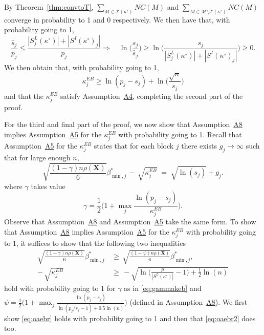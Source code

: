 \documentclass[
  12pt]{article}
\newcommand{\M}{\mathcal{M}}
\newcommand{\T}{\mathcal{T}}
\newcommand{\bX}{\mathbf{X}}
\begin{document}
By Theorem~\ref{thm:convtoT}, $\sum_{M \in \T(\kappa^{\circ})}NC(M)$ and $\sum_{M \in \M\setminus\T(\kappa^{\circ})}NC(M)$ converge in probability to 1 and 0 respectively. We then have that, with probability going to 1,
\begin{equation*}
    \frac{\hat{s}_j}{p_j}\leq \frac{|S^{L}_j(\kappa^{\circ})|+|S^{I}(\kappa^{\circ})_j|}{p_j} \Longrightarrow
    \quad\ln\Big(\frac{s_j}{\hat{s}_j}\Big)\geq \ln\bigg(\frac{s_j}{|S^{L}_j(\kappa^{\circ})|+|S^{I}(\kappa^{\circ})_j|} \bigg) \geq 0.
\end{equation*}
We then obtain that, with probability going to 1,
\begin{equation}\label{eq:eeeeeeeh}
    \kappa^{EB}_j
    \geq  \ln(p_j-s_j)+\ln\Big(\frac{\sqrt{n}}{s_j}\Big)
\end{equation}
and that the $\kappa^{EB}_j$ satisfy Assumption~\hyperlink{lab:A4}{A4}, completing the second part of the proof.\medskip

For the third and final part of the proof, 
we now show that Assumption~\hyperlink{lab:A8}{A8} implies Assumption~\hyperlink{lab:A5}{A5} for the $\kappa_j^{EB}$ with probability going to 1. Recall that Assumption~\hyperlink{lab:A5}{A5} for the $\kappa_j^{EB}$ states that for each block $j$ there exists $g_j\to \infty$ such that for large enough $n$,
    \begin{equation*}
        \sqrt{\frac{(1-\gamma) n\rho(\bX)}{6}}{{\beta_{\min,j}^*}} \,- \,\sqrt{\kappa^{EB}_j} \;=\; \sqrt{\ln(s_j)} + g_j .
    \end{equation*}
where $\gamma$ takes value
\begin{equation}\label{eq:gammakeb}
    \gamma=\frac12\Big(1+\max_j\frac{\ln(p_j-s_j)}{\kappa^{EB}_j}\Big).
\end{equation}
Observe that Assumption~\hyperlink{lab:A8}{A8} and Assumption~\hyperlink{lab:A5}{A5} take the same form. To show that Assumption~\hyperlink{lab:A8}{A8} implies Assumption~\hyperlink{lab:A5}{A5} for the $\kappa_j^{EB}$ with probability going to 1, it suffices to show that the following two inequalities
\begin{align}
    \sqrt{\frac{ (1-\gamma)n\rho(\bX)}{6}}{\beta_{\min,j}^*} \,&\geq \,  \sqrt{\frac{ (1-\psi)n\rho(\bX)}{6}}{\beta_{\min,j}^*}, \label{eq:oaebr} \\
    - \,\sqrt{\kappa^{EB}_j} \,&\geq \,-\sqrt{\ln\bigg(\frac{p}{|S^{L}(\kappa^{\circ})|}-1\bigg)+\frac12\ln(n)}\label{eq:oaebr2}
\end{align}
hold with probability going to 1 for $\gamma$ as in \eqref{eq:gammakeb} and $\psi=\frac12\big(1+\max_j \frac{\ln(p_j-s_j)}{\ln(p_j/s_j-1)+0.5\ln(n)}\big)$ (defined in Assumption~\hyperlink{lab:A8}{A8}). We first show \eqref{eq:oaebr} holds with probability going to 1 and then that \eqref{eq:oaebr2} does too.
\end{document}
